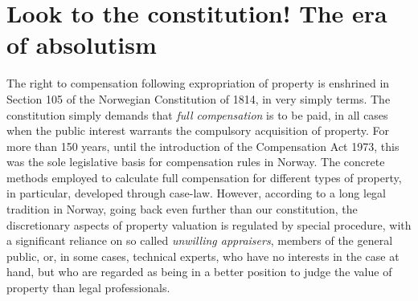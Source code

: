 %

\section{Look to the constitution! The era of absolutism}\label{sec:ab}

The right to compensation following expropriation of property is enshrined in Section 105 of the Norwegian Constitution of 1814, in very simply terms. The constitution simply demands that \emph{full compensation} is to be paid, in all cases when the public interest warrants the compulsory acquisition of property. For more than 150 years, until the introduction of the Compensation Act 1973, this was the sole legislative basis for compensation rules in Norway. The concrete methods employed to calculate full compensation for different types of property, in particular, developed through case-law. However, according to a long legal tradition in Norway, going back even further than our constitution, the discretionary aspects of property valuation is regulated by special procedure, with a significant reliance on so called \emph{unwilling appraisers}, members of the general public, or, in some cases, technical experts, who have no interests in the case at hand, but who are regarded as being in a better position to judge the value of property than legal professionals.

